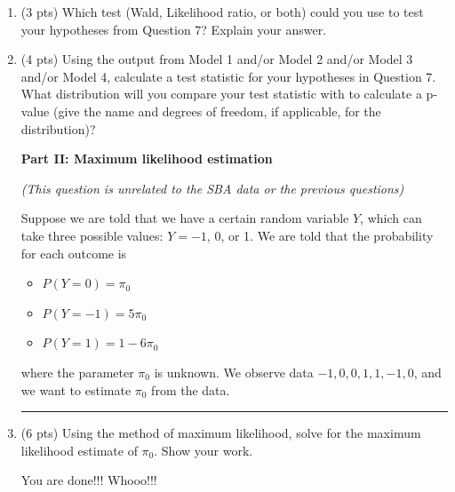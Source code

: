 \documentclass[11pt]{article}
\begin{document}
\begin{enumerate}
\vspace{5cm}

\item (3 pts) Which test (Wald, Likelihood ratio, or both) could you use to test your hypotheses from Question 7? Explain your answer.

\pagebreak


\item (4 pts) Using the output from Model 1 and/or Model 2 and/or Model 3 and/or Model 4, calculate a test statistic for your hypotheses in Question 7. What distribution will you compare your test statistic with to calculate a p-value (give the name and degrees of freedom, if applicable, for the distribution)?


\pagebreak



\textbf{Part II: Maximum likelihood estimation}

\textit{(This question is unrelated to the SBA data or the previous questions)}

Suppose we are told that we have a certain random variable $Y$, which can take three possible values: $Y = -1$, 0, or 1. We are told that the probability for each outcome is
\begin{itemize}
\item $P(Y = 0) = \pi_0$
\item $P(Y = -1) = 5 \pi_0$
\item $P(Y = 1) = 1 - 6 \pi_0$
\end{itemize}
where the parameter $\pi_0$ is unknown. We observe data $-1, 0, 0, 1, 1, -1, 0$, and we want to estimate $\pi_0$ from the data.

\rule{\textwidth}{1pt}


\item (6 pts) Using the method of maximum likelihood, solve for the maximum likelihood estimate of $\pi_0$. Show your work.  

\pagebreak



\huge{You are done!!! Whooo!!!}




\end{enumerate}


\end{document}
